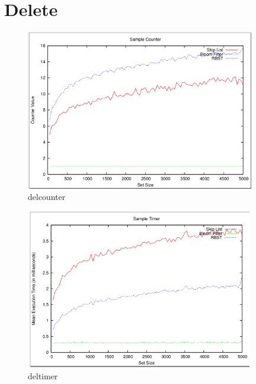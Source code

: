 \documentclass[11pt]{article}
\begin{document}
\section{Delete}
\begin{figure}[ht]
\centering
\includegraphics[height=70mm,width=100mm]{delcounter.png}
\caption{delcounter}
\end{figure}
\begin{figure}[ht]
\centering
\includegraphics[height=70mm,width=100mm]{deltimer.png}
\caption{deltimer}
\end{figure}
\end{document}
